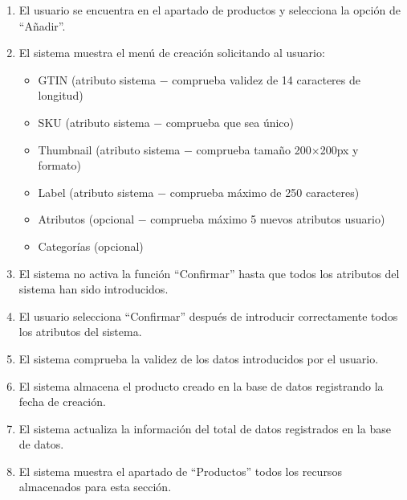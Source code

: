 \begin{enumerate}
    \item El usuario se encuentra en el apartado de productos y selecciona la opción de \enquote{Añadir}.
    \item El sistema muestra el menú de creación solicitando al usuario:
    \begin{itemize}
        \item GTIN (atributo sistema $-$ comprueba validez de 14 caracteres de longitud)
        \item SKU (atributo sistema $-$ comprueba que sea único)
        \item Thumbnail (atributo sistema $-$ comprueba tamaño 200$\times$200px y formato)
        \item Label (atributo sistema $-$ comprueba máximo de 250 caracteres)
        \item Atributos (opcional $-$ comprueba máximo 5 nuevos atributos usuario)
        \item Categorías (opcional)
    \end{itemize}
    \item El sistema no activa la función \enquote{Confirmar} hasta que todos los atributos del sistema han sido introducidos.
    \item El usuario selecciona \enquote{Confirmar} después de introducir correctamente todos los atributos del sistema.
    \item El sistema comprueba la validez de los datos introducidos por el usuario.
    \item El sistema almacena el producto creado en la base de datos registrando la fecha de creación.
    \item El sistema actualiza la información del total de datos registrados en la base de datos.
    \item El sistema muestra el apartado de \enquote{Productos} todos los recursos almacenados para esta sección.
\end{enumerate}

